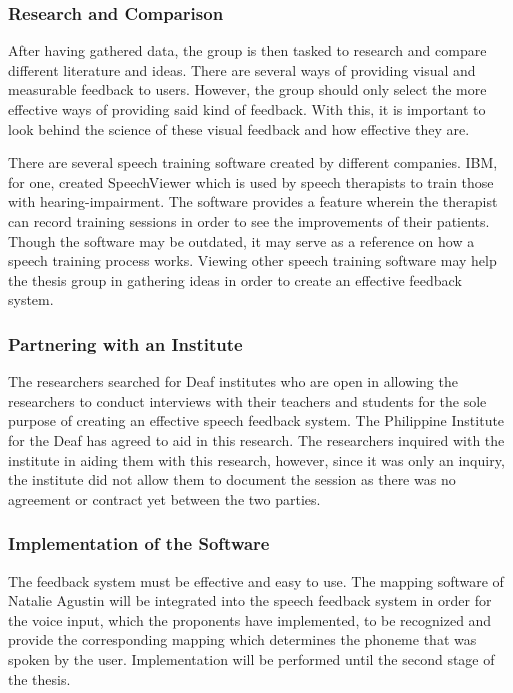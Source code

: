 \subsubsection{Research and Comparison}
After having gathered data, the group is then tasked to research and compare different literature and ideas. There are several ways of providing visual and measurable feedback to users. However, the group should only select the more effective ways of providing said kind of feedback. With this, it is important to look behind the science of these visual feedback and how effective they are.

There are several speech training software created by different companies. IBM, for one, created SpeechViewer which is used by speech therapists to train those with hearing-impairment. The software provides a feature wherein the therapist can record training sessions in order to see the improvements of their patients. Though the software may be outdated, it may serve as a reference on how a speech training process works. Viewing other speech training software may help the thesis group in gathering ideas in order to create an effective feedback system.

\subsubsection{Partnering with an Institute}
The researchers searched for Deaf institutes who are open in allowing the researchers to conduct interviews with their teachers and students for the sole purpose of creating an effective speech feedback system. The Philippine Institute for the Deaf has agreed to aid in this research. The researchers inquired with the institute in aiding them with this research, however, since it was only an inquiry, the institute did not allow them to document the session as there was no agreement or contract yet between the two parties.

\subsubsection{Implementation of the Software}
The feedback system must be effective and easy to use. The mapping software of Natalie Agustin \citeyear{agustin:2014:SOM} will be integrated into the speech feedback system in order for the voice input, which the proponents have implemented, to be recognized and provide the corresponding mapping which determines the phoneme that was spoken by the user. Implementation will be performed until the second stage of the thesis.

